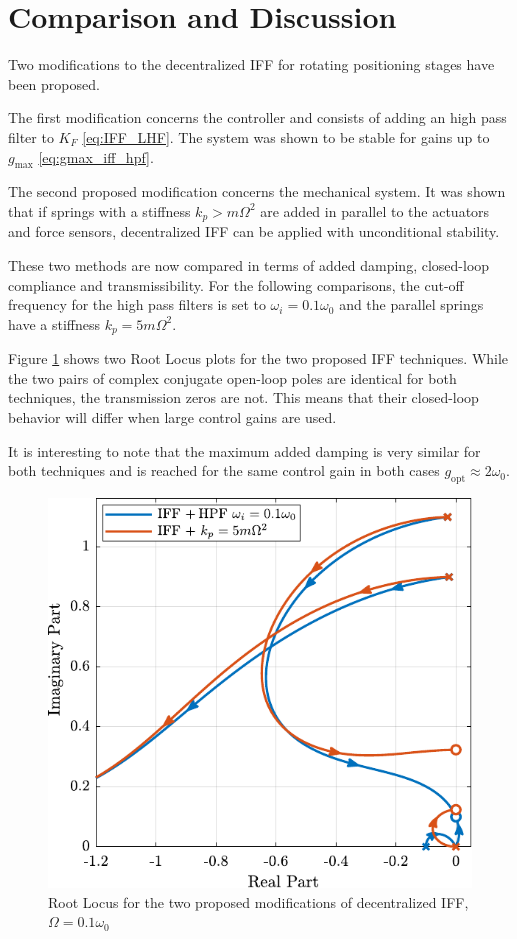 \documentclass{ISMA_USD2020}
\begin{document}
\section{Comparison and Discussion}
\label{sec:org118e3e9}
\label{sec:comparison}
Two modifications to the decentralized IFF for rotating positioning stages have been proposed.

The first modification concerns the controller and consists of adding an high pass filter to \(K_F\) \eqref{eq:IFF_LHF}.
The system was shown to be stable for gains up to \(g_\text{max}\) \eqref{eq:gmax_iff_hpf}.

The second proposed modification concerns the mechanical system.
It was shown that if springs with a stiffness \(k_p > m \Omega^2\) are added in parallel to the actuators and force sensors, decentralized IFF can be applied with unconditional stability.

These two methods are now compared in terms of added damping, closed-loop compliance and transmissibility.
For the following comparisons, the cut-off frequency for the high pass filters is set to \(\omega_i = 0.1 \omega_0\) and the parallel springs have a stiffness \(k_p = 5 m \Omega^2\).

\par
Figure \ref{fig:comp_root_locus} shows two Root Locus plots for the two proposed IFF techniques.
While the two pairs of complex conjugate open-loop poles are identical for both techniques, the transmission zeros are not.
This means that their closed-loop behavior will differ when large control gains are used.

It is interesting to note that the maximum added damping is very similar for both techniques and is reached for the same control gain in both cases \(g_\text{opt} \approx 2 \omega_0\).

\begin{figure}[htbp]
\centering
\includegraphics[scale=1]{figs/comp_root_locus.pdf}
\caption{\label{fig:comp_root_locus}Root Locus for the two proposed modifications of decentralized IFF, \(\Omega = 0.1 \omega_0\)}
\end{figure}
\end{document}
